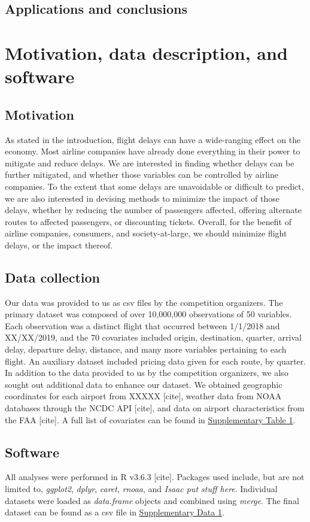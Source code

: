 \documentclass[12pt, a4paper]{book}
\newcommand\tab[1][1cm]{\hspace*{#1}}
\begin{document}
	\section{Applications and conclusions}
	
\chapter{Motivation, data description, and software}
	\section{Motivation}
	\tab As stated in the introduction, flight delays can have a wide-ranging effect on the economy. Most airline companies have already done everything in their power to mitigate and reduce delays. We are interested in finding whether delays can be further mitigated, and whether those variables can be controlled by airline companies. To the extent that some delays are unavoidable or difficult to predict, we are also interested in devising methods to minimize the impact of those delays, whether by reducing the number of passengers affected, offering alternate routes to affected passengers, or discounting tickets. Overall, for the benefit of airline companies, consumers, and society-at-large, we should minimize flight delays, or the impact thereof. 
	\section{Data collection}
	\tab Our data was provided to us as csv files by the competition organizers. The primary dataset was composed of over 10,000,000 observations of 50 variables. Each observation was a distinct flight that occurred between 1/1/2018 and XX/XX/2019, and the 70 covariates included origin, destination, quarter, arrival delay, departure delay, distance, and many more variables pertaining to each flight. An auxiliary dataset included pricing data given for each route, by quarter. \\
	\tab In addition to the data provided to us by the competition organizers, we also sought out additional data to enhance our dataset. We obtained geographic coordinates for each airport from XXXXX [cite], weather data from NOAA databases through the NCDC API [cite], and data on airport characteristics from the FAA [cite]. A full list of covariates can be found in \underline{Supplementary Table 1}. 
	\section{Software}
	\tab All analyses were performed in R v3.6.3 [cite]. Packages used include, but are not limited to, \textit{ggplot2}, \textit{dplyr}, \textit{caret}, \textit{rnoaa}, and \textit{Isaac put stuff here}. Individual datasets were loaded as \textit{data.frame} objects and combined using \textit{merge}. The final dataset can be found as a csv file in \underline{Supplementary Data 1}. 
	
\end{document}

